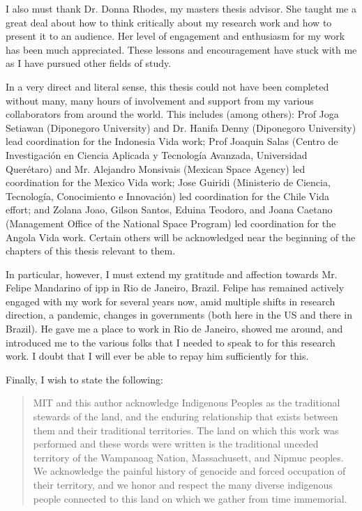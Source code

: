 I also must thank Dr. Donna Rhodes, my masters thesis advisor. She taught me a great deal about how to think critically about my research work and how to present it to an audience. Her level of engagement and enthusiasm for my work has been much appreciated. These lessons and encouragement have stuck with me as I have pursued other fields of study.

In a very direct and literal sense, this thesis could not have been completed without many, many hours of involvement and support from my various collaborators from around the world. This includes (among others): Prof Joga Setiawan (Diponegoro University) and Dr. Hanifa Denny (Diponegoro University) lead coordination for the Indonesia Vida work; Prof Joaquin Salas (Centro de Investigación en Ciencia Aplicada y Tecnología Avanzada, Universidad Querétaro) and Mr. Alejandro Monsivais (Mexican Space Agency) led coordination for the Mexico Vida work; Jose Guiridi (Ministerio de Ciencia, Tecnología, Conocimiento e Innovación) led coordination for the Chile Vida effort; and Zolana Joao, Gilson Santos, Eduina Teodoro, and Joana Caetano (Management Office of the National Space Program) led coordination for the Angola Vida work. Certain others will be acknowledged near the beginning of the chapters of this thesis relevant to them.

In particular, however, I must extend my gratitude and affection towards Mr. Felipe Mandarino of \ac{ipp} in Rio de Janeiro, Brazil. Felipe has remained actively engaged with my work for several years now, amid multiple shifts in research direction, a pandemic, changes in governments (both here in the US and there in Brazil). He gave me a place to work in Rio de Janeiro, showed me around, and introduced me to the various folks that I needed to speak to for this research work. I doubt that I will ever be able to repay him sufficiently for this. 

Finally, I wish to state the following:

\blockquote{MIT and this author acknowledge Indigenous Peoples as the traditional stewards of the land, and the enduring relationship that exists between them and their traditional territories. The land on which this work was performed and these words were written is the traditional unceded territory of the Wampanoag Nation, Massachusett, and Nipmuc peoples. We acknowledge the painful history of genocide and forced occupation of their territory, and we honor and respect the many diverse indigenous people connected to this land on which we gather from time immemorial.}

